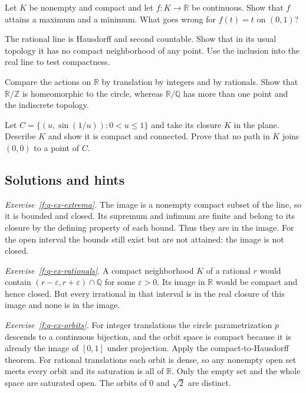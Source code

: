 \begin{exercise}\label{f:q-ex-extrema}
Let $K$ be nonempty and compact and let $f:K\to\mathbb R$ be continuous. Show that $f$ attains a maximum and a minimum. What goes wrong for $f(t)=t$ on $(0,1)$?
\end{exercise}
\begin{exercise}\label{f:q-ex-rationals}
The rational line is Hausdorff and second countable. Show that in its usual topology it has no compact neighborhood of any point. Use the inclusion into the real line to test compactness.
\end{exercise}
\begin{exercise}\label{f:q-ex-orbits}
Compare the actions on $\mathbb R$ by translation by integers and by rationals. Show that $\mathbb R/\mathbb Z$ is homeomorphic to the circle, whereas $\mathbb R/\mathbb Q$ has more than one point and the indiscrete topology.
\end{exercise}
\begin{exercise}\label{f:q-ex-sine}
Let $C=\{(u,\sin(1/u)):0<u\leq1\}$ and take its closure $K$ in the plane. Describe $K$ and show it is compact and connected. Prove that no path in $K$ joins $(0,0)$ to a point of $C$.
\end{exercise}

\subsection*{Solutions and hints}
\noindent\emph{Exercise~\ref{f:q-ex-extrema}.}
The image is a nonempty compact subset of the line, so it is bounded and closed. Its supremum and infimum are finite and belong to its closure by the defining property of each bound. Thus they are in the image. For the open interval the bounds still exist but are not attained: the image is not closed.

\smallskip\noindent\emph{Exercise~\ref{f:q-ex-rationals}.}
A compact neighborhood $K$ of a rational $r$ would contain $(r-\varepsilon,r+\varepsilon)\cap\mathbb Q$ for some $\varepsilon>0$. Its image in $\mathbb R$ would be compact and hence closed. But every irrational in that interval is in the real closure of this image and none is in the image.

\smallskip\noindent\emph{Exercise~\ref{f:q-ex-orbits}.}
For integer translations the circle parametrization $p$ descends to a continuous bijection, and the orbit space is compact because it is already the image of $[0,1]$ under projection. Apply the compact-to-Hausdorff theorem. For rational translations each orbit is dense, so any nonempty open set meets every orbit and its saturation is all of $\mathbb R$. Only the empty set and the whole space are saturated open. The orbits of $0$ and $\sqrt2$ are distinct.

